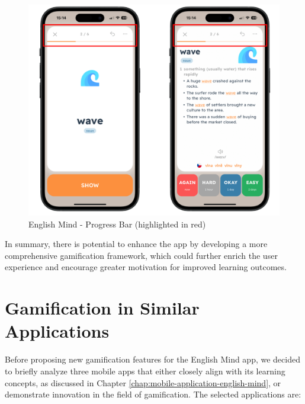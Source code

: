 \begin{itemize}
    \begin{figure}[!h]
        \includegraphics[width=1.05\textwidth]{src/figures/em-flashcards-progress-bar.png}
        \caption{English Mind - Progress Bar (highlighted in red)}
        \label{fig:em-flashcards-progress-bar}
    \end{figure}
    
\end{itemize}

In summary, there is potential to enhance the app by developing a more comprehensive gamification framework, which could further enrich the user experience and encourage greater motivation for improved learning outcomes.

\newpage

\section{Gamification in Similar Applications}

Before proposing new gamification features for the English Mind app, we decided to briefly analyze three mobile apps that either closely align with its learning concepts, as discussed in Chapter \ref{chap:mobile-application-english-mind}, or demonstrate innovation in the field of gamification. The selected applications are: 

